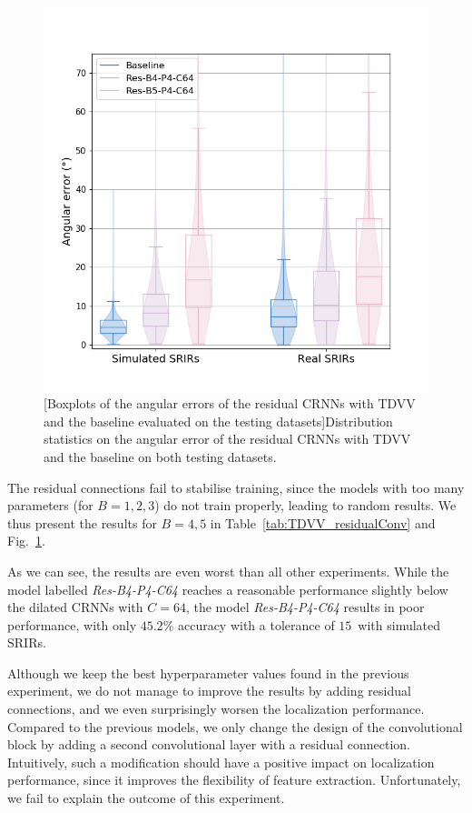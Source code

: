 \begin{figure}[ht]
    \begin{center}
    \includegraphics[width=0.5\linewidth]{Images/chap6/boxplots_residualConv.png}
    [Boxplots of the angular errors of the residual CRNNs with TDVV and the baseline evaluated on the testing datasets]{Distribution statistics on the angular error of the residual CRNNs with TDVV and the baseline on both testing datasets.}
    \label{fig:boxplots_residualConv}
    \end{center}
\end{figure}

The residual connections fail to stabilise training, since the models with too many parameters (for $B=1,2,3$) do not train properly, leading to random results. We thus present the results for $B=4,5$ in Table~\ref{tab:TDVV_residualConv} and Fig.~\ref{fig:boxplots_residualConv}.

As we can see, the results are even worst than all other experiments. While the model labelled \textit{Res-B4-P4-C64} reaches a reasonable performance slightly below the dilated CRNNs with $C=64$, the model \textit{Res-B4-P4-C64} results in poor performance, with only $45.2$\% accuracy with a tolerance of $15$\textdegree~with simulated SRIRs.

Although we keep the best hyperparameter values found in the previous experiment, we do not manage to improve the results by adding residual connections, and we even surprisingly worsen the localization performance. Compared to the previous models, we only change the design of the convolutional block by adding a second convolutional layer with a residual connection. Intuitively, such a modification should have a positive impact on localization performance, since it improves the flexibility of feature extraction. Unfortunately, we fail to explain the outcome of this experiment.

